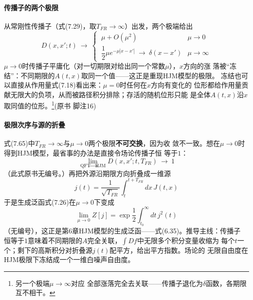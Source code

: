 \paragraph{传播子的两个极限}
从常刚性传播子（式(7.29)，取$T_{FR}\to\infty$）出发，两个极端给出
\begin{equation*}
D(x,x';t)\ \longrightarrow\
\begin{cases}
\ \mu+O(\mu^{2}) & \mu\to0\\[4pt]
\ \dfrac{1}{2}\mu e^{-\mu|x-x'|}\ \longrightarrow\ \delta(x-x')
& \mu\to\infty
\end{cases}
\tag{7.65}
\end{equation*}
$\mu\to0$时传播子平庸化（对一切期限对给出同一个常数$\mu$），$x$方向的涨
落被“冻结”：不同期限的$A(t,x)$取同一个值——这正是重现HJM模型的极限。
冻结也可以直接从作用量式(7.18)看出来：$\mu=0$时任何在$x$方向有变化的
位形都给作用量贡献无限大的负项，从而被路径积分排除；存活的随机位形只能
是全体$A(t,x)$沿$x$取同值的位形。\footnote{另一个极端$\mu\to\infty$对应
全部涨落完全去关联——传播子退化为$\delta$函数，各期限互不相干。}(原书
脚注16)

\paragraph{极限次序与源的折叠}
式(7.65)中$T_{FR}\to\infty$与$\mu\to0$两个极限\textbf{不可交换}，因为收
敛不一致。想在$\mu\to0$时得到HJM模型，最省事的办法是直接令场论传播子恒
等于$1$：
\begin{equation*}
\lim_{\text{QFT}\to\text{HJM}}D(x,x';t,T_{FR})\ \longrightarrow\ 1
\end{equation*}
（此式原书无编号。）再把外源沿期限方向折叠成一维源
\begin{equation*}
j(t)=\frac{1}{\sqrt{T_{FR}}}\int_{t}^{t+T_{FR}}dx\,J(t,x)
\tag{7.66}
\end{equation*}
于是生成泛函式(7.26)在$\mu\to0$下变成
\begin{equation*}
\lim_{\mu\to0}Z[j]=\exp\frac{1}{2}\int_{t_{0}}^{\infty}dt\,j^{2}(t)
\end{equation*}
（无编号），这正是第6章HJM模型的生成泛函——式(6.35)。推导主线：传播子
恒等于$1$意味着不同期限的$A$完全关联，$\int Df$中无限多个积分变量收缩为
每个$t$一个；剩下的高斯积分对折叠源$j(t)$配平方，给出平方指数。场论的
无限自由度在HJM极限下冻结成一个一维白噪声自由度。


